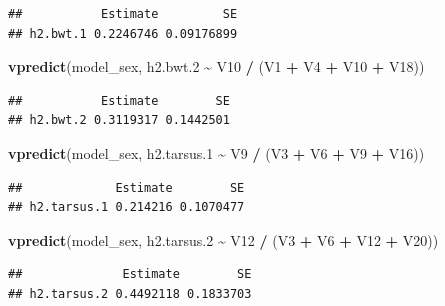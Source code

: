 \documentclass[
  12pt,
]{book}
\newenvironment{Shaded}{\begin{snugshade}}{\end{snugshade}}
\newcommand{\FloatTok}[1]{\textcolor[rgb]{0.00,0.00,0.81}{#1}}
\newcommand{\KeywordTok}[1]{\textcolor[rgb]{0.13,0.29,0.53}{\textbf{#1}}}
\newcommand{\NormalTok}[1]{#1}
\newcommand{\OperatorTok}[1]{\textcolor[rgb]{0.81,0.36,0.00}{\textbf{#1}}}
\newcommand{\StringTok}[1]{\textcolor[rgb]{0.31,0.60,0.02}{#1}}
\begin{document}
\begin{verbatim}
##           Estimate         SE
## h2.bwt.1 0.2246746 0.09176899
\end{verbatim}

\begin{Shaded}
\begin{Highlighting}[]
\KeywordTok{vpredict}\NormalTok{(model\_sex, h2.bwt}\FloatTok{.2} \OperatorTok{\textasciitilde{}}\StringTok{ }\NormalTok{V10 }\OperatorTok{/}\StringTok{ }\NormalTok{(V1 }\OperatorTok{+}\StringTok{ }\NormalTok{V4 }\OperatorTok{+}\StringTok{ }\NormalTok{V10 }\OperatorTok{+}\StringTok{ }\NormalTok{V18))}
\end{Highlighting}
\end{Shaded}

\begin{verbatim}
##           Estimate        SE
## h2.bwt.2 0.3119317 0.1442501
\end{verbatim}

\begin{Shaded}
\begin{Highlighting}[]
\KeywordTok{vpredict}\NormalTok{(model\_sex, h2.tarsus}\FloatTok{.1} \OperatorTok{\textasciitilde{}}\StringTok{ }\NormalTok{V9 }\OperatorTok{/}\StringTok{ }\NormalTok{(V3 }\OperatorTok{+}\StringTok{ }\NormalTok{V6 }\OperatorTok{+}\StringTok{ }\NormalTok{V9 }\OperatorTok{+}\StringTok{ }\NormalTok{V16))}
\end{Highlighting}
\end{Shaded}

\begin{verbatim}
##             Estimate        SE
## h2.tarsus.1 0.214216 0.1070477
\end{verbatim}

\begin{Shaded}
\begin{Highlighting}[]
\KeywordTok{vpredict}\NormalTok{(model\_sex, h2.tarsus}\FloatTok{.2} \OperatorTok{\textasciitilde{}}\StringTok{ }\NormalTok{V12 }\OperatorTok{/}\StringTok{ }\NormalTok{(V3 }\OperatorTok{+}\StringTok{ }\NormalTok{V6 }\OperatorTok{+}\StringTok{ }\NormalTok{V12 }\OperatorTok{+}\StringTok{ }\NormalTok{V20))}
\end{Highlighting}
\end{Shaded}

\begin{verbatim}
##              Estimate        SE
## h2.tarsus.2 0.4492118 0.1833703
\end{verbatim}
\end{document}
